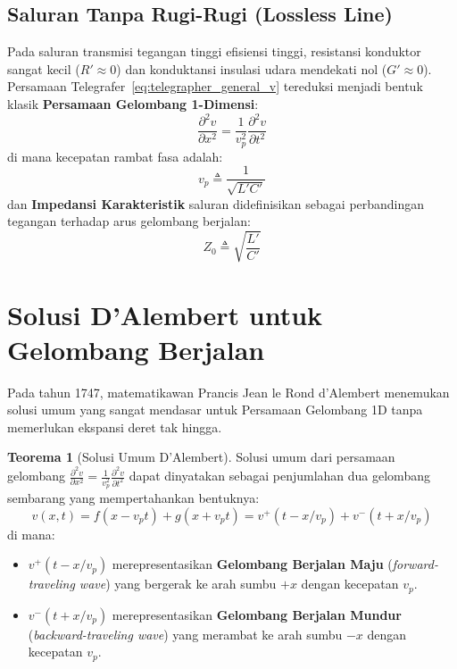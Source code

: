 \documentclass[11pt,a4paper]{article}
\theoremstyle{definition}
\newtheorem{theorem}{Teorema}[section]
\begin{document}
\subsection{Saluran Tanpa Rugi-Rugi (Lossless Line)}
Pada saluran transmisi tegangan tinggi efisiensi tinggi, resistansi konduktor sangat kecil ($R' \approx 0$) dan konduktansi insulasi udara mendekati nol ($G' \approx 0$). Persamaan Telegrafer~\eqref{eq:telegrapher_general_v} tereduksi menjadi bentuk klasik \textbf{Persamaan Gelombang 1-Dimensi}:
\begin{equation}
    \frac{\partial^2 v}{\partial x^2} = \frac{1}{v_p^2} \frac{\partial^2 v}{\partial t^2}
    \label{eq:lossless_wave_equation}
\end{equation}
di mana kecepatan rambat fasa adalah:
\begin{equation}
    v_p \triangleq \frac{1}{\sqrt{L'C'}}
    \label{eq:phase_velocity}
\end{equation}
dan \textbf{Impedansi Karakteristik} saluran didefinisikan sebagai perbandingan tegangan terhadap arus gelombang berjalan:
\begin{equation}
    Z_0 \triangleq \sqrt{\frac{L'}{C'}}
    \label{eq:char_impedance}
\end{equation}

\section{Solusi D'Alembert untuk Gelombang Berjalan}

Pada tahun 1747, matematikawan Prancis Jean le Rond d'Alembert menemukan solusi umum yang sangat mendasar untuk Persamaan Gelombang 1D tanpa memerlukan ekspansi deret tak hingga.

\begin{theorem}[Solusi Umum D'Alembert]
Solusi umum dari persamaan gelombang $\frac{\partial^2 v}{\partial x^2} = \frac{1}{v_p^2} \frac{\partial^2 v}{\partial t^2}$ dapat dinyatakan sebagai penjumlahan dua gelombang sembarang yang mempertahankan bentuknya:
\begin{equation}
    v(x, t) = f(x - v_p t) + g(x + v_p t) = v^+(t - x/v_p) + v^-(t + x/v_p)
    \label{eq:dalembert_voltage}
\end{equation}
di mana:
\begin{itemize}[leftmargin=*]
    \item $v^+(t - x/v_p)$ merepresentasikan \textbf{Gelombang Berjalan Maju} (\textit{forward-traveling wave}) yang bergerak ke arah sumbu $+x$ dengan kecepatan $v_p$.
    \item $v^-(t + x/v_p)$ merepresentasikan \textbf{Gelombang Berjalan Mundur} (\textit{backward-traveling wave}) yang merambat ke arah sumbu $-x$ dengan kecepatan $v_p$.
\end{itemize}
\end{theorem}
\end{document}
